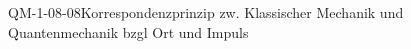 
\begin{CONC}{QM-1-08-08}{Korrespondenzprinzip zw. Klassischer Mechanik und Quantenmechanik bzgl Ort und Impuls}
\end{CONC}
